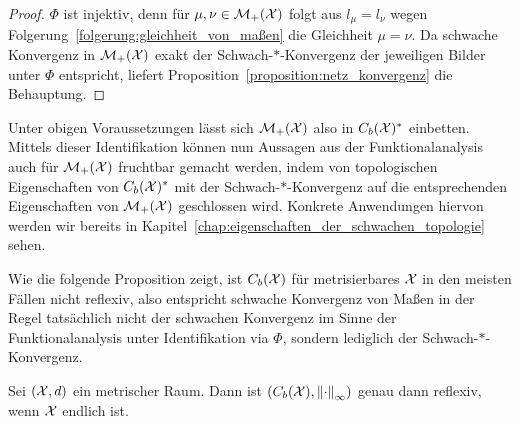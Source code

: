 \documentclass[../thesis/thesis.tex]{subfiles}
\begin{document}
	\begin{proof}
		$\Phi$ ist injektiv, denn für $\mu, \nu \in \mathcal{M}_{+}(\mathcal{X})$ folgt aus $l_\mu = l_\nu$ wegen Folgerung~\ref{folgerung:gleichheit_von_maßen} die Gleichheit $\mu = \nu$. 
		Da schwache Konvergenz in $\mathcal{M}_{+}(\mathcal{X})$ exakt der Schwach-$\ast$-Konvergenz der jeweiligen Bilder unter $\Phi$ entspricht, liefert Proposition~\ref{proposition:netz_konvergenz}
		die Behauptung.
	\end{proof}

	Unter obigen Voraussetzungen lässt sich $\mathcal{M}_{+}(\mathcal{X})$ also in $C_b(\mathcal{X})^\ast$ einbetten. Mittels dieser Identifikation können nun Aussagen aus der 
	Funktionalanalysis auch für $\mathcal{M}_{+}(\mathcal{X})$ fruchtbar gemacht werden, indem von topologischen Eigenschaften von
	$C_b(\mathcal{X})^\ast$ mit der Schwach-$\ast$-Konvergenz auf die entsprechenden Eigenschaften von 
	$\mathcal{M}_{+}(\mathcal{X})$ geschlossen wird. Konkrete Anwendungen hiervon werden wir bereits in Kapitel~\ref{chap:eigenschaften_der_schwachen_topologie} sehen.
	
	Wie die folgende Proposition zeigt, ist $C_b(\mathcal{X})$ für metrisierbares $\mathcal{X}$ in den meisten Fällen nicht reflexiv, also entspricht schwache Konvergenz von Maßen
	in der Regel tatsächlich nicht der schwachen Konvergenz im Sinne der Funktionalanalysis unter Identifikation via $\Phi$, sondern lediglich der Schwach-$\ast$-Konvergenz.
	
	\begin{Proposition}
		Sei $(\mathcal{X}, d)$ ein metrischer Raum. Dann ist $(C_b(\mathcal{X}), \left\lVert\cdot\right\rVert_{\infty})$ genau dann reflexiv, wenn $\mathcal{X}$ endlich ist.
	\end{Proposition}
\end{document}
